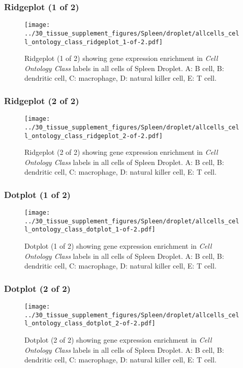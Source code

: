 \subsubsection{Ridgeplot (1 of 2)}
\begin{figure}[h]
\centering
\texttt{[image: ../30\_tissue\_supplement\_figures/Spleen/droplet/allcells\_cell\_ontology\_class\_ridgeplot\_1-of-2.pdf]}

\caption{ Ridgeplot (1 of 2)  showing gene expression enrichment in \emph{Cell Ontology Class} labels in all cells of Spleen Droplet. A: B cell, B: dendritic cell, C: macrophage, D: natural killer cell, E: T cell.}
\end{figure}


\clearpage

\subsubsection{Ridgeplot (2 of 2)}
\begin{figure}[h]
\centering
\texttt{[image: ../30\_tissue\_supplement\_figures/Spleen/droplet/allcells\_cell\_ontology\_class\_ridgeplot\_2-of-2.pdf]}

\caption{ Ridgeplot (2 of 2)  showing gene expression enrichment in \emph{Cell Ontology Class} labels in all cells of Spleen Droplet. A: B cell, B: dendritic cell, C: macrophage, D: natural killer cell, E: T cell.}
\end{figure}


\clearpage

\subsubsection{Dotplot (1 of 2)}
\begin{figure}[h]
\centering
\texttt{[image: ../30\_tissue\_supplement\_figures/Spleen/droplet/allcells\_cell\_ontology\_class\_dotplot\_1-of-2.pdf]}

\caption{ Dotplot (1 of 2)  showing gene expression enrichment in \emph{Cell Ontology Class} labels in all cells of Spleen Droplet. A: B cell, B: dendritic cell, C: macrophage, D: natural killer cell, E: T cell.}
\end{figure}


\clearpage

\subsubsection{Dotplot (2 of 2)}
\begin{figure}[h]
\centering
\texttt{[image: ../30\_tissue\_supplement\_figures/Spleen/droplet/allcells\_cell\_ontology\_class\_dotplot\_2-of-2.pdf]}

\caption{ Dotplot (2 of 2)  showing gene expression enrichment in \emph{Cell Ontology Class} labels in all cells of Spleen Droplet. A: B cell, B: dendritic cell, C: macrophage, D: natural killer cell, E: T cell.}
\end{figure}


